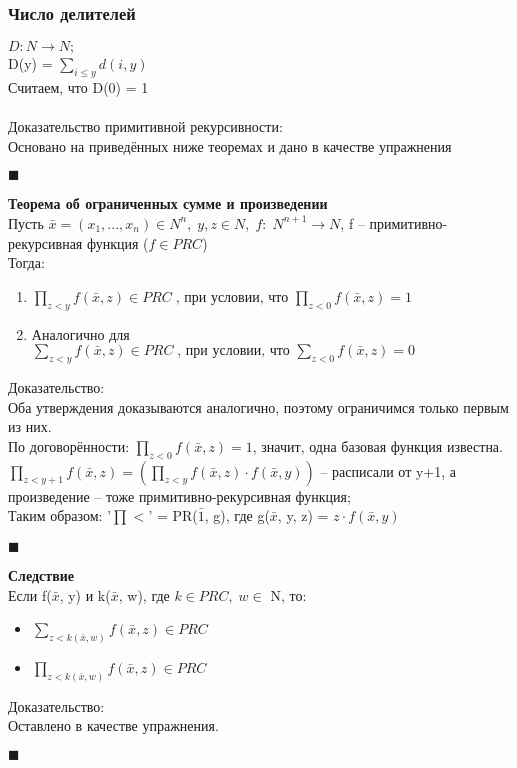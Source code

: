 \subsubsection{Число делителей}
    $D: N \rightarrow N;$\\
    D(y) = 
    $\sum\limits_{i \leq y} d(i, y)$
    \\Считаем, что D(0) = 1\\
    \\Доказательство примитивной рекурсивности:\\
    Основано на приведённых ниже теоремах и дано в качестве упражнения
    \begin{flushright}
        $\blacksquare$
    \end{flushright}
    \textbf{Теорема об ограниченных сумме и произведении}\\
    Пусть $\bar x = (x_{1}, ... , x_{n}) \in N^{n},\; y, z \in N,\; f:\;N^{n+1} \rightarrow N$, f -- примитивно-рекурсивная функция ($f \in PRC$)\\
    Тогда:
    \begin{enumerate}
        \item $\prod\limits_{z < y}f(\bar x , z) \in PRC\;\text{, при условии, что }\prod\limits_{z < 0}f(\bar x , z) = 1$
        \item Аналогично для $\sum\limits_{z < y}f(\bar x , z) \in PRC\;\text{, при условии, что }\sum\limits_{z < 0}f(\bar x , z) = 0$
    \end{enumerate}
    Доказательство:\\
    Оба утверждения доказываются аналогично, поэтому ограничимся только первым из них.\\
    По договорённости: $\prod\limits_{z < 0}f(\bar x , z) = 1$, значит, одна базовая функция известна.\\
    $\prod\limits_{z < y+1}f(\bar x , z) = (\prod\limits_{z < y}f(\bar x , z) \cdot f(\bar x, y))$ -- расписали от y+1, а произведение -- тоже примитивно-рекурсивная функция;\\
    Таким образом: '$\prod\limits_{}<$' = PR($\bar 1$, g), где g($\bar x$, y, z) = $z \cdot f(\bar x, y)$
    \begin{flushright}
        $\blacksquare$
    \end{flushright}
    \textbf{Следствие}\\
    Если f($\bar x$, y) и k($\bar x$, w), где $k \in PRC,\; w\in$ N, то:\\
    \begin{itemize}
        \item $\sum\limits_{z < k(\bar x, w)}f(\bar x , z) \in PRC$
        \item $\prod\limits_{z < k(\bar x, w)}f(\bar x , z) \in PRC$
    \end{itemize}
    Доказательство:\\
    Оставлено в качестве упражнения.
    \begin{flushright}
        $\blacksquare$
    \end{flushright}
    
